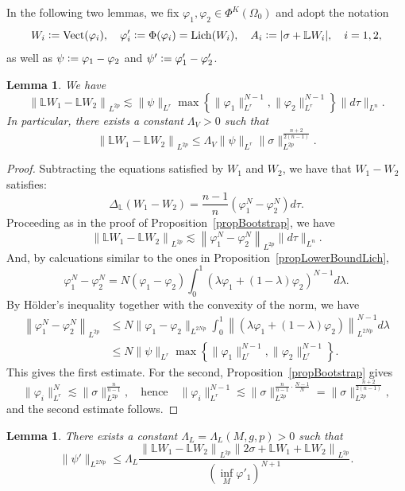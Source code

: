 \documentclass[a4paper, 10pt, reqno]{amsart}
\theoremstyle{plain}
\newtheorem{lemma}[thm]{Lemma}
\theoremstyle{remark}
\theoremstyle{definition}
\renewcommand{\phi}{\varphi}
\newcommand{\bL}{\mathbb{L}}
\newcommand{\definedas}{\mathrel{\raise.095ex\hbox{\rm :}\mkern-5.2mu=}}
\begin{document}
In the following two lemmas, we fix $\phi_1, \phi_2 \in \Phi^K(\Omega_0)$ and
adopt the notation
\[
	W_i \definedas \mathrm{Vect}(\phi_i),
	\quad
	\phi'_i \definedas \Phi(\phi_i) = \mathrm{Lich}(W_i),
	\quad
	A_i \definedas |\sigma + \bL W_i|,
	\quad i = 1, 2,
\]
as well as $\psi \definedas \phi_1 - \phi_2$ and $\psi' \definedas \phi'_1 -
	\phi'_2$.

\begin{lemma}\label{lmEstimate_LW1-LW2}
	We have
	\[
		\left\|\bL W_1 - \bL W_2\right\|_{L^{2p}}
		\lesssim \|\psi\|_{L^r} \max \left\{\|\phi_1\|_{L^r}^{N-1}, \|\phi_2\|_{L^r}^{N-1}\right\} \|d\tau\|_{L^n}.
	\]
	In particular, there exists a constant $\Lambda_V > 0$ such that
	\[
		\left\|\bL W_1 - \bL W_2\right\|_{L^{2p}}
		\leq \Lambda_V \|\psi\|_{L^r} \|\sigma\|_{L^{2p}}^{\frac{n+2}{2(n-1)}}.
	\]
\end{lemma}

\begin{proof}
	Subtracting the equations satisfied by $W_1$ and $W_2$, we have that $W_1-W_2$
	satisfies:
	\[
		\Delta_{\bL} (W_1-W_2) = \frac{n-1}n (\phi_1^N - \phi_2^N)d\tau.
	\]
	Proceeding as in the proof of Proposition~\ref{propBootstrap}, we have
	\[
		\left\|\bL W_1 - \bL W_2\right\|_{L^{2p}}
		\lesssim \left\|\phi_1^N - \phi_2^N\right\|_{L^{2p}} \|d\tau\|_{L^n}.
	\]
	And, by calcuations similar to the ones in
	Proposition~\ref{propLowerBoundLich},
	\[
		\phi_1^N - \phi_2^N = N (\phi_1 - \phi_2) \int_0^1 \left(\lambda \phi_1 + (1-\lambda) \phi_2\right)^{N-1} d\lambda.
	\]
	By H\"older's inequality together with the convexity of the norm, we have
	\begin{align*}
		\left\|\phi_1^N - \phi_2^N\right\|_{L^{2p}}
		 & \leq N \|\phi_1 - \phi_2\|_{L^{2Np}} \int_0^1 \left\|\left(\lambda \phi_1 + (1-\lambda) \phi_2\right)\right\|_{L^{2Np}}^{N-1} d\lambda \\
		 & \leq N \|\psi\|_{L^r} \max \left\{\|\phi_1\|_{L^r}^{N-1}, \|\phi_2\|_{L^r}^{N-1}\right\}.
	\end{align*}
	This gives the first estimate. For the second, Proposition~\ref{propBootstrap}
	gives
	\[
		\|\phi_i\|_{L^r}^N \lesssim \|\sigma\|_{L^{2p}}^{\frac{n}{n-1}},
		\quad\text{hence}\quad
		\|\phi_i\|_{L^r}^{N-1} \lesssim \|\sigma\|_{L^{2p}}^{\frac{n}{n-1} \cdot \frac{N-1}{N}}
		= \|\sigma\|_{L^{2p}}^{\frac{n+2}{2(n-1)}},
	\]
	and the second estimate follows.
\end{proof}

\begin{lemma}\label{lmMajorationPsi}
	There exists a constant $\Lambda_L = \Lambda_L(M, g, p) > 0$ such that
	\[
		\|\psi'\|_{L^{2Np}}
		\leq \Lambda_L \frac{\left\|\bL W_1 - \bL W_2\right\|_{L^{2p}} \left\|2 \sigma + \bL W_1 + \bL W_2\right\|_{L^{2p}}}{\left(\inf_M \phi'_1\right)^{N+1}}.
	\]
\end{lemma}
\end{document}
